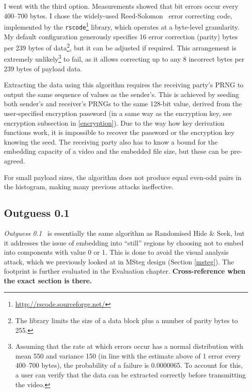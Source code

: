 \documentclass[12pt,british,twoside,notitlepage,usenames,dvipsnames,hypens,final]{report}
\numberwithin{equation}{section}
\numberwithin{figure}{section}
\begin{document}
I went with the third option. Measurements showed that bit errors occur every 400--700 bytes. I chose the widely-used Reed-Solomon~\cite{clarke2002reed} error correcting code, implemented by the \texttt{rscode}\footnote{\url{http://rscode.sourceforge.net/}} library, which operates at a byte-level granularity. My default configuration generously specifies 16 error correction (parity) bytes per 239 bytes of data\footnote{The library limits the size of a data block plus a number of parity bytes to 255.}, but it can be adjusted if required. This arrangement is extremely unlikely\footnote{Assuming that the rate at which errors occur has a normal distribution with mean 550 and variance 150 (in line with the estimate above of 1 error every 400--700 bytes), the probability of a failure is 0.0000065. To account for this, a user can verify that the data can be extracted correctly before transmitting the video.} to fail, as it allows correcting up to any 8 incorrect bytes per 239 bytes of payload data.

Extracting the data using this algorithm requires the receiving party's PRNG to output the same sequence of values as the sender's. This is achieved by seeding both sender's and receiver's PRNGs to the same 128-bit value, derived from the user-specified encryption password (in a same way as the encryption key, see encryption subsection in \ref{encryption}). Due to the way how key derivation functions work, it is impossible to recover the password or the encryption key knowing the seed. The receiving party also has to know a bound for the embedding capacity of a video and the embedded file size, but these can be pre-agreed.

For small payload sizes, the algorithm does not produce equal even-odd pairs in the histogram, making many previous attacks ineffective.

\subsection{Outguess 0.1}

\emph{Outguess 0.1}~\cite{bateman} is essentially the same algorithm as Randomised Hide \& Seek, but it addresses the issue of embedding into ``still'' regions by choosing not to embed into components with value 0 or 1. This is done to avoid the visual analysis attack, which we previously looked at in MSteg design (Section \ref{msteg}). The footprint is further evaluated in the Evaluation chapter. \textbf{Cross-reference when the exact section is there.}  
\end{document}
